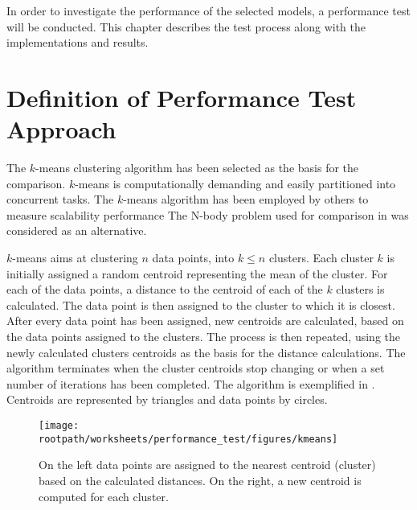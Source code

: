 \makeatletter {}\makeatother
{}
%
In order to investigate the performance of the selected models, a performance test will be conducted. This chapter describes the test process along with the implementations and results. 
\label{chap:performance}
\section{Definition of Performance Test Approach}
The $k$-means clustering algorithm has been selected as the basis for the comparison. $k$-means is computationally demanding and easily partitioned into concurrent tasks\cite[p. 128]{epstein2011towards}. The $k$-means algorithm has been employed by others to measure scalability performance\cite{epstein2011towards}\cite{tardieu2014x10} The N-body problem used for comparison in \cite{totoo2012haskell} was considered as an alternative.

$k$-means aims at clustering $n$ data points, into $k \leq n$ clusters\cite[p. 451]{dataminingconceptsandtechniques}\cite[p. 128]{epstein2011towards}. Each cluster $k$ is initially assigned a random centroid representing the mean of the cluster. For each of the data points, a distance to the centroid of each of the $k$ clusters is calculated. The data point is then assigned to the cluster to which it is closest. After every data point has been assigned, new centroids are calculated, based on the data points assigned to the clusters. The process is then repeated, using the newly calculated clusters centroids as the basis for the distance calculations. The algorithm terminates when the cluster centroids stop changing or when a set number of iterations has been completed\cite[p. 128]{epstein2011towards}. The algorithm is exemplified in . Centroids are represented by triangles and data points by circles.

\begin{figure}[ht!]
\centering
\texttt{[image: \\rootpath/worksheets/performance\_test/figures/kmeans]}
\caption{On the left data points are assigned to the nearest centroid (cluster) based on the calculated distances. On the right, a new centroid is computed for each cluster.}\label{fig:kmeans}
\end{figure}

